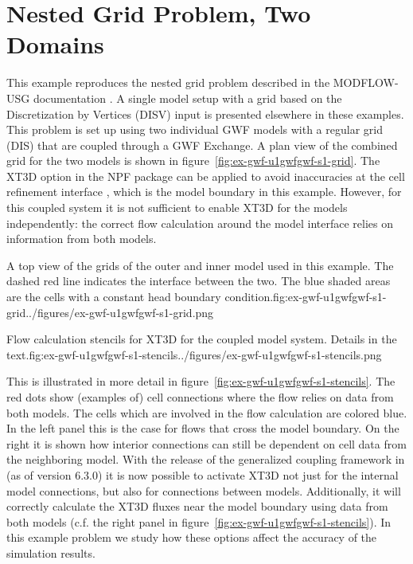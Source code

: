 \section{Nested Grid Problem, Two Domains}

This example reproduces the nested grid problem described in the MODFLOW-USG documentation \citep{modflowusg}. A single model setup with a grid based on the Discretization by Vertices (DISV) input is presented elsewhere in these examples. This problem is set up using two individual GWF models with a regular grid (DIS) that are coupled through a GWF Exchange. A plan view of the combined grid for the two models is shown in figure~\ref{fig:ex-gwf-u1gwfgwf-s1-grid}. The XT3D option in the NPF package can be applied to avoid inaccuracies at the cell refinement interface \citep{modflow6xt3d}, which is the model boundary in this example. However, for this coupled system it is not sufficient to enable XT3D for the models independently: the correct flow calculation around the model interface relies on information from both models.

\begin{StandardFigure}{A top view of the grids of the outer and inner model used in this example. The dashed red line indicates the interface between the two. The blue shaded areas are the cells with a constant head boundary condition.}{fig:ex-gwf-u1gwfgwf-s1-grid}{../figures/ex-gwf-u1gwfgwf-s1-grid.png}
\end{StandardFigure}

\begin{StandardFigure}{Flow calculation stencils for XT3D for the coupled model system. Details in the text.}{fig:ex-gwf-u1gwfgwf-s1-stencils}{../figures/ex-gwf-u1gwfgwf-s1-stencils.png}
\end{StandardFigure} 

This is illustrated in more detail in figure~\ref{fig:ex-gwf-u1gwfgwf-s1-stencils}. The red dots show (examples of) cell connections where the flow relies on data from both models. The cells which are involved in the flow calculation are colored blue. In the left panel this is the case for flows that cross the model boundary. On the right it is shown how interior connections can still be dependent on cell data from the neighboring model. With the release of the generalized coupling framework in \mf (as of version 6.3.0) it is now possible to activate XT3D not just for the internal model connections, but also for connections between models. Additionally, it will correctly calculate the XT3D fluxes near the model boundary using data from both models (c.f. the right panel in figure~\ref{fig:ex-gwf-u1gwfgwf-s1-stencils}). In this example problem we study how these options affect the accuracy of the simulation results.


